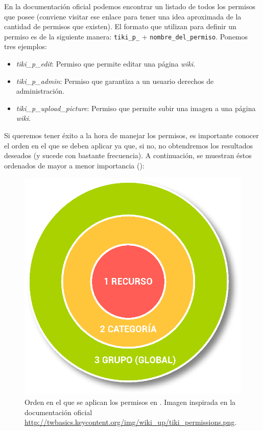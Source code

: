 \parabreak

En la documentación oficial podemos encontrar un listado de todos los permisos que posee \tiki{} \cite{web:listado-permisos} (conviene visitar ese enlace para tener una idea aproximada de la cantidad de permisos que existen). El formato que utilizan para definir un permiso es de la siguiente manera: \texttt{tiki\_p\_} + \texttt{nombre\_del\_permiso}. Ponemos tres ejemplos:

\begin{itemize}
\item \textit{tiki\_p\_edit}: Permiso que permite editar una página \textit{wiki}.
\item \textit{tiki\_p\_admin}: Permiso que garantiza a un usuario derechos de administración.
\item \textit{tiki\_p\_upload\_picture}: Permiso que permite subir una imagen a una página \textit{wiki}.
\end{itemize}

Si queremos tener éxito a la hora de manejar los permisos, es importante conocer el orden en el que se deben aplicar ya que, si no, no obtendremos los resultados deseados (y sucede con bastante frecuencia). A continuación, se muestran éstos ordenados de mayor a menor importancia (): 

\begin{figure}
\centering
\includegraphics[width=.8\linewidth]{../graphics/fig_esquema_permisos_circular.eps}
\caption{Orden en el que se aplican los permisos en \tiki{}. Imagen inspirada en la documentación oficial \url{http://twbasics.keycontent.org/img/wiki_up/tiki_permissions.png}.}\label{fig:esquema_permisos_circular}
\end{figure}

